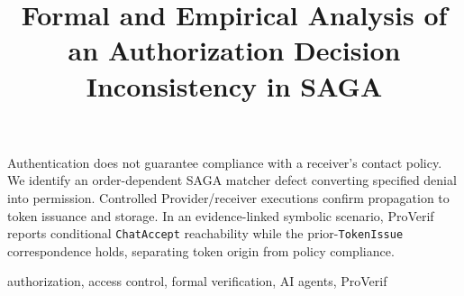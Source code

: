 \documentclass[letter]{ieice}
\title{Formal and Empirical Analysis of an Authorization Decision Inconsistency in SAGA}
\begin{document}
\maketitle

\begin{summary}
Authentication does not guarantee compliance with a receiver's contact policy.
We identify an order-dependent SAGA matcher defect converting specified denial
into permission. Controlled Provider/receiver executions confirm propagation
to token issuance and storage. In an evidence-linked symbolic scenario,
ProVerif reports conditional \texttt{ChatAccept} reachability while the
prior-\texttt{TokenIssue} correspondence holds, separating token origin from
policy compliance.
\end{summary}

\begin{keywords}
authorization, access control, formal verification,
AI agents, ProVerif
\end{keywords}









\end{document}
